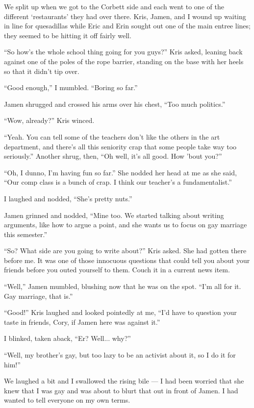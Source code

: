 We split up when we got to the Corbett side and each went to one of the different `restaurants' they had over there.  Kris, Jamen, and I wound up waiting in line for quesadillas while Eric and Erin sought out one of the main entree lines; they seemed to be hitting it off fairly well.

``So how's the whole school thing going for you guys?'' Kris asked, leaning back against one of the poles of the rope barrier, standing on the base with her heels so that it didn't tip over.

``Good enough,'' I mumbled.  ``Boring so far.''

Jamen shrugged and crossed his arms over his chest, ``Too much politics.''

``Wow, already?'' Kris winced.

``Yeah.  You can tell some of the teachers don't like the others in the art department, and there's all this seniority crap that some people take way too seriously.''  Another shrug, then, ``Oh well, it's all good.  How 'bout you?''

``Oh, I dunno, I'm having fun so far.''  She nodded her head at me as she said, ``Our comp class is a bunch of crap.  I think our teacher's a fundamentalist.''

I laughed and nodded, ``She's pretty nuts.''

Jamen grinned and nodded, ``Mine too.  We started talking about writing arguments, like how to argue a point, and she wants us to focus on gay marriage this semester.''

``So?  What side are you going to write about?'' Kris asked.  She had gotten there before me.  It was one of those innocuous questions that could tell you about your friends before you outed yourself to them.  Couch it in a current news item.

``Well,'' Jamen mumbled, blushing now that he was on the spot.  ``I'm all for it.  Gay marriage, that is.''

``Good!''  Kris laughed and looked pointedly at me, ``I'd have to question your taste in friends, Cory, if Jamen here was against it.''

I blinked, taken aback, ``Er?  Well... why?''

``Well, my brother's gay, but too lazy to be an activist about it, so I do it for him!''

We laughed a bit and I swallowed the rising bile --- I had been worried that she knew that I was gay and was about to blurt that out in front of Jamen.  I had wanted to tell everyone on my own terms.

